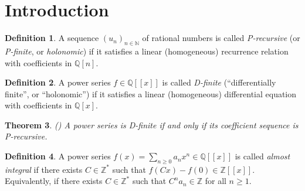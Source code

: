\documentclass[11pt]{article}
\theoremstyle{definition}
\newtheorem{defi}{Definition}[section]
\theoremstyle{plain}
\newtheorem{thm}[defi]{Theorem}
\theoremstyle{remark}
\begin{document}
\begin{abstract}
This project investigates the arithmetic nature of P-recursive sequences through the lens of their D-finite generating functions. Building on classical tools from differential algebra, we revisit the integrality criterion for Motzkin-type sequences due to Klazar and Luca, and propose a unified method for analysing global boundedness and algebraicity within a broader class of holonomic sequences. The central contribution is an algorithm that determines whether all, none, or a one-dimensional family of solutions to certain second-order recurrences are globally bounded. This approach generalizes earlier \emph{ad hoc} methods and applies successfully to several well-known sequences from the \href{https://oeis.org/}{OEIS}.
\end{abstract}

\begingroup
  \hypersetup{linkcolor=black}
  \tableofcontents
\endgroup

\newpage


\section{Introduction}

\begin{defi}\label{defi:prec}
A sequence $(u_n)_{n\in\mathbb{N}}$ of rational numbers is called \textit{P-recursive} (or \textit{P-finite}, or \textit{holonomic}) if it satisfies a linear (homogeneous) recurrence relation with coefficients in $\mathbb{Q}[n]$.
\end{defi}

\begin{defi}\label{defi:dfun}
A power series $f \in \mathbb{Q}[[x]]$ is called \textit{D-finite} (``differentially finite'', or ``holonomic'') if it satisfies a linear (homogeneous) differential equation with coefficients in $\mathbb{Q}[x]$.
\end{defi}

\begin{thm}(\cite[Theorem 1.5]{S80}) 
A power series is D-finite if and only if its coefficient sequence is P-recursive.
\end{thm}

\begin{defi}\label{defi:almint}
A power series $f(x) = \sum\limits_{n \geq 0}a_nx^n \in \mathbb{Q}[[x]]$ is called \textit{almost integral} if there exists $C \in \mathbb{Z}^*$ such that $f(Cx)-f(0) \in \mathbb{Z}[[x]]$.
Equivalently, if there exists $C \in \mathbb{Z}^* $ such that $C^n a_n \in \mathbb{Z}$ for all $n \geq 1$.
\end{defi}
\end{document}

